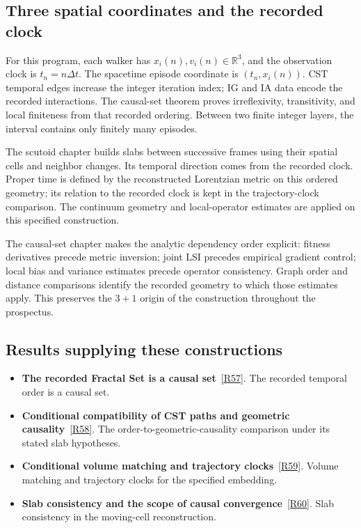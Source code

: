 \documentclass[11pt,a4paper]{article}
\begin{document}
\subsection*{Three spatial coordinates and the recorded clock}
For this program, each walker has \(x_i(n),v_i(n)\in\mathbb R^3\), and the observation clock is \(t_n=n\Delta t\). The spacetime episode coordinate is \((t_n,x_i(n))\). CST temporal edges increase the integer iteration index; IG and IA data encode the recorded interactions. The causal-set theorem proves irreflexivity, transitivity, and local finiteness from that recorded ordering. Between two finite integer layers, the interval contains only finitely many episodes.

The scutoid chapter builds slabs between successive frames using their spatial cells and neighbor changes. Its temporal direction comes from the recorded clock. Proper time is defined by the reconstructed Lorentzian metric on this ordered geometry; its relation to the recorded clock is kept in the trajectory-clock comparison. The continuum geometry and local-operator estimates are applied on this specified construction.

The causal-set chapter makes the analytic dependency order explicit: fitness derivatives precede metric inversion; joint LSI precedes empirical gradient control; local bias and variance estimates precede operator consistency. Graph order and distance comparisons identify the recorded geometry to which those estimates apply. This preserves the \(3+1\) origin of the construction throughout the prospectus.
\subsection*{Results supplying these constructions}
\begin{itemize}
\item \textbf{The recorded Fractal Set is a causal set}~\hyperref[src:thm-fractal-is-causal-set]{[R57]}. The recorded temporal order is a causal set.
\item \textbf{Conditional compatibility of CST paths and geometric causality}~\hyperref[src:prop-fractal-causal-order-equivalence]{[R58]}. The order-to-geometric-causality comparison under its stated slab hypotheses.
\item \textbf{Conditional volume matching and trajectory clocks}~\hyperref[src:thm-fractal-faithful-embedding]{[R59]}. Volume matching and trajectory clocks for the specified embedding.
\item \textbf{Slab consistency and the scope of causal convergence}~\hyperref[src:prop-scutoid-cst-compatibility]{[R60]}. Slab consistency in the moving-cell reconstruction.
\end{itemize}
\end{document}
